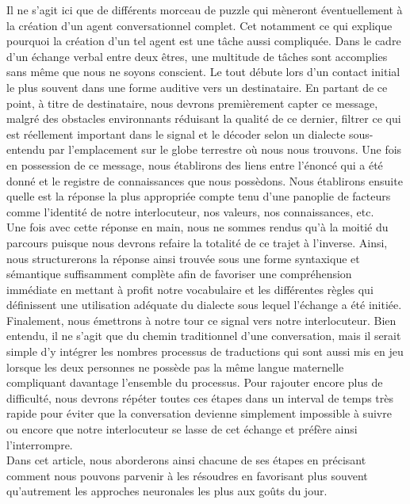 Il ne s'agit ici que de différents morceau de puzzle qui mèneront éventuellement à la création d'un agent conversationnel complet. Cet notamment ce qui explique pourquoi la création d'un tel agent est une tâche aussi compliquée. Dans le cadre d'un échange verbal entre deux êtres, une multitude de tâches sont accomplies sans même que nous ne soyons conscient. Le tout débute lors d'un contact initial le plus souvent dans une forme auditive vers un destinataire. En partant de ce point, à titre de destinataire, nous devrons premièrement capter ce message, malgré des obstacles environnants réduisant la qualité de ce dernier, filtrer ce qui est réellement important dans le signal et le décoder selon un dialecte sous-entendu par l'emplacement sur le globe terrestre où nous nous trouvons. Une fois en possession de ce message, nous établirons des liens entre l'énoncé qui a été donné et le registre de connaissances que nous possèdons. Nous établirons ensuite quelle est la réponse la plus appropriée compte tenu d'une panoplie de facteurs comme l'identité de notre interlocuteur, nos valeurs, nos connaissances, etc. \\

Une fois avec cette réponse en main, nous ne sommes rendus qu'à la moitié du parcours puisque nous devrons refaire la totalité de ce trajet à l'inverse. Ainsi, nous structurerons la réponse ainsi trouvée sous une forme syntaxique et sémantique suffisamment complète afin de favoriser une compréhension immédiate en mettant à profit notre vocabulaire et les différentes règles qui définissent une utilisation adéquate du dialecte sous lequel l'échange a été initiée. Finalement, nous émettrons à notre tour ce signal vers notre interlocuteur. Bien entendu, il ne s'agit que du chemin traditionnel d'une conversation, mais il serait simple d'y intégrer les nombres processus de traductions qui sont aussi mis en jeu lorsque les deux personnes ne possède pas la même langue maternelle compliquant davantage l'ensemble du processus. Pour rajouter encore plus de difficulté, nous devrons répéter toutes ces étapes dans un interval de temps très rapide pour éviter que la conversation devienne simplement impossible à suivre ou encore que notre interlocuteur se lasse de cet échange et préfère ainsi l'interrompre.\\

Dans cet article, nous aborderons ainsi chacune de ses étapes en précisant comment nous pouvons parvenir à les résoudres en favorisant plus souvent qu'autrement les approches neuronales les plus aux goûts du jour.
